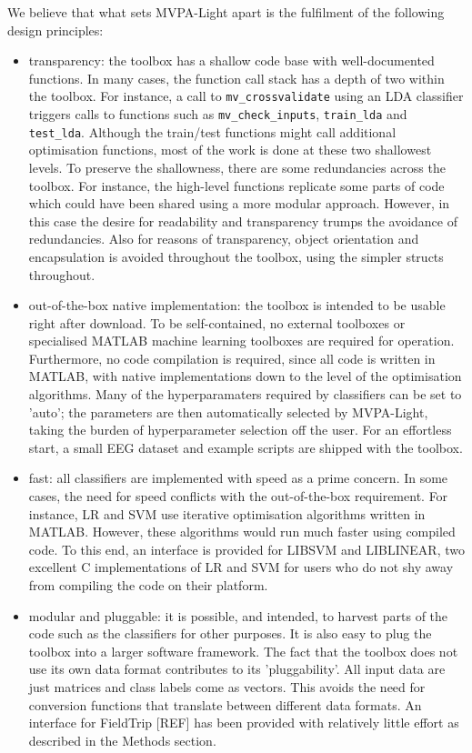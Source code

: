 \documentclass[utf8]{frontiersSCNS} %
\newcommand{\mvpa}{MVPA-Light}
\begin{document}
We believe that what sets \mvpa{} apart is the fulfilment of the following design principles: 

\begin{itemize}
\item transparency: the toolbox has a shallow code base with well-documented functions. In many cases, the function call stack has a depth of two within the toolbox. For instance, a call to \texttt{mv\_crossvalidate} using an LDA classifier triggers calls to functions such as  \texttt{mv\_check\_inputs}, \texttt{train\_lda} and \texttt{test\_lda}. Although the train/test functions might call additional optimisation functions, most of the work is done at these two shallowest levels. To preserve the shallowness, there are some redundancies across the toolbox. For instance, the high-level functions replicate some parts of code which could have been shared using a more modular approach. However, in this case the desire for readability and transparency trumps the avoidance of redundancies. Also for reasons of transparency, object orientation and encapsulation is avoided throughout the toolbox, using the simpler structs throughout.
\item out-of-the-box native implementation: the toolbox is intended to be usable right after download. To be self-contained, no external toolboxes or specialised MATLAB machine learning toolboxes are required for operation. Furthermore, no code compilation is required, since all code is written in MATLAB, with native implementations down to the level of the optimisation algorithms. Many of the hyperparamaters required by classifiers can be set to 'auto'; the parameters are then automatically selected by \mvpa{}, taking the burden of hyperparameter selection off the user. For an effortless start, a small EEG dataset and example scripts are shipped with the toolbox.
\item fast: all classifiers are implemented with speed as a prime concern. In some cases, the need for speed conflicts with the out-of-the-box requirement. For instance, LR and SVM use iterative optimisation algorithms written in MATLAB. However, these algorithms would run much faster using compiled code. To this end, an interface is provided for LIBSVM and LIBLINEAR, two excellent C implementations of LR and SVM for users who do not shy away from compiling the code on their platform.
\item modular and pluggable: it is possible, and intended, to harvest parts of the code such as the classifiers for other purposes. It is also easy to plug the toolbox into a larger software framework. The fact that the toolbox does not use its own data format contributes to its 'pluggability'. All input data are just matrices and class labels come as vectors. This avoids the need for conversion functions that translate between different data formats. An interface for FieldTrip [REF] has been provided with relatively little effort as described in the Methods section.

\end{itemize}
\end{document}
